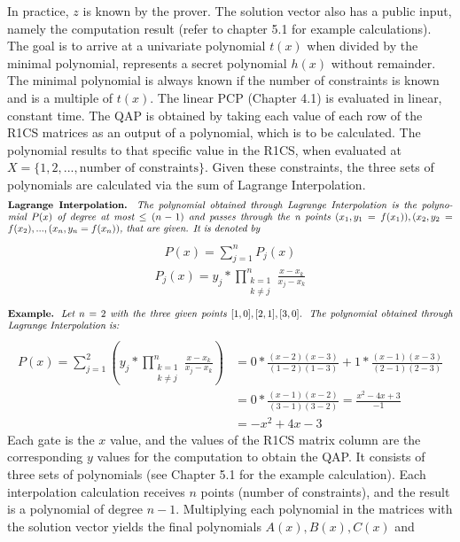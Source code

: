 In practice, \(z\) is known by the prover. The solution vector also has a public input, namely the computation result (refer to chapter 5.1 for example calculations). The goal is to arrive at a univariate polynomial \(t(x)\) when divided by the minimal polynomial, represents a secret polynomial \(h(x)\) without remainder. The minimal polynomial is always known if the number of constraints is known and is a multiple of \(t(x)\). The linear PCP (Chapter 4.1) is evaluated in linear, constant time. The QAP is obtained by taking each value of each row of the R1CS matrices as an output of a polynomial, which is to be calculated. The polynomial results to that specific value in the R1CS, when evaluated at \(X = \{1, 2, ..., \text{number of constraints}\}\). Given these constraints, the three sets of polynomials are calculated via the sum of Lagrange Interpolation.
\begin{align*}
    \text{\parbox{450pt}{\textbf{Lagrange Interpolation.} \textit{The polynomial obtained through Lagrange Interpolation is the polynomial \(P(x)\) of degree at most \(\leq (n-1)\) and passes through the n points \((x_1, y_1 = f(x_1)), (x_2, y_2 = f(x_2), ..., (x_n, y_n = f(x_n))\), that are given. It is denoted by}}}
\end{align*}
\begin{align}
        P(x) = \sum_{j=1}^{n} P_j(x)
\end{align}
\begin{align*}
        P_j(x) = y_j * \prod_{\substack{k = 1 \\ k \neq j}}^{n}\frac{x-x_k}{x_j-x_k}
\end{align*}
\begin{align*}
    \text{\parbox{450pt}{\textbf{Example.} \textit{Let \(n = 2\) with the three given points \([1,0], [2,1], [3,0]\). The polynomial obtained through Lagrange Interpolation is: 
    }}}
\end{align*}
\begin{align*}
    P(x) = \sum_{j=1}^{2}\left(y_j*\prod_{\substack{k = 1 \\ k \neq j}}^{n}\frac{x-x_k}{x_j-x_k}\right)
    &= 0 * \frac{(x-2)(x-3)}{(1-2)(1-3)}+1*\frac{(x-1)(x-3)}{(2-1)(2-3)}\\
    &= 0 * \frac{(x-1)(x-2)}{(3-1)(3-2)} = \frac{x^2-4x+3}{-1}\\
    &= -x^2+4x-3
\end{align*}
Each gate is the \(x\) value, and the values of the R1CS matrix column are the corresponding \(y\) values for the computation to obtain the QAP. It consists of three sets of polynomials (see Chapter 5.1 for the example calculation). Each interpolation calculation receives \(n\) points (number of constraints), and the result is a polynomial of degree \(n-1\). Multiplying each polynomial in the matrices with the solution vector yields the final polynomials \(A(x), B(x), C(x)\) and
